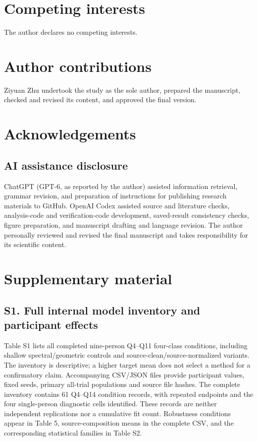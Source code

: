 \documentclass[11pt]{article}
\begin{document}
\section*{Competing interests}
The author declares no competing interests.

\section*{Author contributions}
Ziyuan Zhu undertook the study as the sole author, prepared the manuscript, checked and revised its content, and approved the final version.

\section*{Acknowledgements}
\subsection*{AI assistance disclosure}
ChatGPT (GPT-6, as reported by the author) assisted information retrieval, grammar revision, and preparation of instructions for publishing research materials to GitHub. OpenAI Codex assisted source and literature checks, analysis-code and verification-code development, saved-result consistency checks, figure preparation, and manuscript drafting and language revision. The author personally reviewed and revised the final manuscript and takes responsibility for its scientific content.

\section*{Supplementary material}
\subsection*{S1. Full internal model inventory and participant effects}
Table S1 lists all completed nine-person Q4--Q11 four-class conditions, including shallow spectral/geometric controls and source-clean/source-normalized variants. The inventory is descriptive; a higher target mean does not select a method for a confirmatory claim. Accompanying CSV/JSON files provide participant values, fixed seeds, primary all-trial populations and source file hashes. The complete inventory contains 61 Q4--Q14 condition records, with repeated endpoints and the four single-person diagnostic cells identified. These records are neither independent replications nor a cumulative fit count. Robustness conditions appear in Table 5, source-composition means in the complete CSV, and the corresponding statistical families in Table S2.
\end{document}
